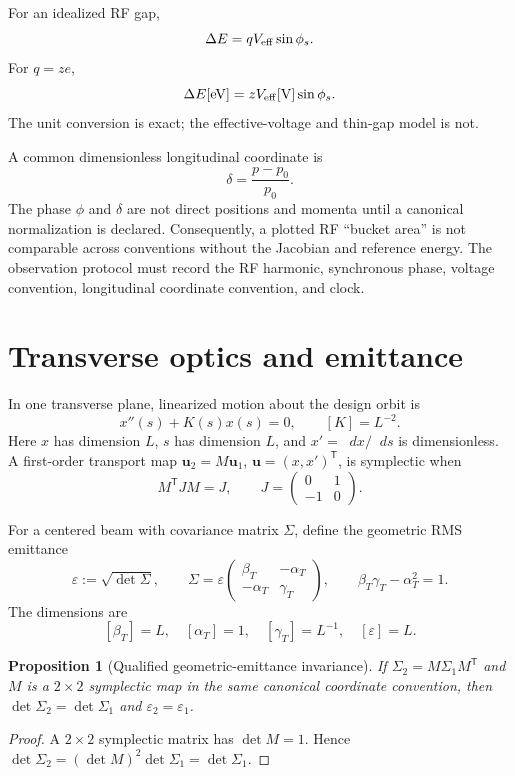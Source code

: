 \documentclass[11pt,a4paper]{article}
\theoremstyle{definition}
\theoremstyle{plain}
\newtheorem{proposition}[definition]{Proposition}
\theoremstyle{remark}
\newcommand{\dd}{\mathop{}\!d}
\begin{document}
For an idealized RF gap,
\[
\Delta E=qV_{\rm eff}\sin\phi_s.
\]
For \(q=ze\),
\[
\Delta E[\mathrm{eV}]
=zV_{\rm eff}[\mathrm V]\sin\phi_s.
\]
The unit conversion is exact; the effective-voltage and thin-gap
model is not.

A common dimensionless longitudinal coordinate is
\[
\delta=\frac{p-p_0}{p_0}.
\]
The phase \(\phi\) and \(\delta\) are not direct positions and momenta
until a canonical normalization is declared. Consequently, a plotted
RF ``bucket area'' is not comparable across conventions without the
Jacobian and reference energy. The observation protocol must record
the RF harmonic, synchronous phase, voltage convention, longitudinal
coordinate convention, and clock.

\section{Transverse optics and emittance}

In one transverse plane, linearized motion about the design orbit is
\[
x''(s)+K(s)x(s)=0,
\qquad [K]=L^{-2}.
\]
Here \(x\) has dimension \(L\), \(s\) has dimension \(L\), and
\(x'=\dd x/\dd s\) is dimensionless. A first-order transport map
\(\bm u_2=M\bm u_1\), \(\bm u=(x,x')^\mathsf T\), is symplectic when
\[
M^\mathsf TJM=J,\qquad
J=\begin{pmatrix}0&1\\-1&0\end{pmatrix}.
\]

For a centered beam with covariance matrix \(\Sigma\), define the
geometric RMS emittance
\[
\varepsilon:=\sqrt{\det\Sigma},
\qquad
\Sigma=
\varepsilon
\begin{pmatrix}
\beta_T&-\alpha_T\\
-\alpha_T&\gamma_T
\end{pmatrix},
\qquad
\beta_T\gamma_T-\alpha_T^2=1.
\]
The dimensions are
\[
[\beta_T]=L,\quad [\alpha_T]=1,\quad
[\gamma_T]=L^{-1},\quad [\varepsilon]=L.
\]

\begin{proposition}[Qualified geometric-emittance invariance]
If \(\Sigma_2=M\Sigma_1M^\mathsf T\) and \(M\) is a \(2\times2\)
symplectic map in the same canonical coordinate convention, then
\(\det\Sigma_2=\det\Sigma_1\) and
\(\varepsilon_2=\varepsilon_1\).
\end{proposition}

\begin{proof}
A \(2\times2\) symplectic matrix has \(\det M=1\). Hence
\(\det\Sigma_2=(\det M)^2\det\Sigma_1=\det\Sigma_1\).
\end{proof}
\end{document}
